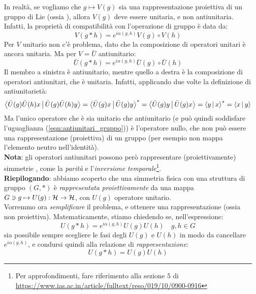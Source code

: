\documentclass[../../FisicaTeorica.tex]{subfiles}
\begin{document}
In realtà, se vogliamo che $g \mapsto V(g)$ sia una rappresentazione proiettiva di un gruppo di Lie (ossia ), allora $V(g)$ deve essere unitaria, e non antiunitaria.\\
Infatti, la proprietà di compatibilità con l'operazione di gruppo è data da:
\[
V(g*h) = e^{i\alpha(g,h)}V(g)\circ V(h)
\]
Per $V$ unitario non c'è problema, dato che la composizione di operatori unitari è ancora unitaria. Ma per $V=\bar{U}$ antiunitario:
\begin{equation}
\bar{U}(g*h) = e^{i\alpha(g,h)}\bar{U}(g)\circ \bar{U}(h)
\label{eqn:antiunitari_gruppo}
\end{equation}
Il membro a sinistra è antiunitario, mentre quello a destra è la composizione di operatori antiunitari, che è unitaria. Infatti, applicando due volte la definizione di antiunitarietà:
\[
\Braket{\bar{U}(g)\bar{U}(h) x|\bar{U}(g)\bar{U}(h)y} = \Braket{\bar{U}(g) x | \bar{U}(g) y}^* = \Braket{\bar{U}(g)y|\bar{U}(g)x} = \Braket{y|x}^* = \Braket{x|y}
\]
Ma l'unico operatore che è sia unitario che antiunitario (e può quindi soddisfare l'uguaglianza (\ref{eqn:antiunitari_gruppo})) è l'operatore nullo, che non può essere una rappresentazione (proiettiva) di un gruppo (per esempio non mappa l'elemento neutro nell'identità).\\

\textbf{Nota}: gli operatori antiunitari possono però rappresentare (proiettivamente) simmetrie , come la \textit{parità} e l'\textit{inversione temporale}\footnote{Per approfondimenti, fare riferimento alla sezione $5$ di \url{https://www.ias.ac.in/article/fulltext/reso/019/10/0900-0916}}.\\

\textbf{Riepilogando}: abbiamo scoperto che una simmetria fisica con una struttura di gruppo $(G,*)$ è \textit{rappresentata proiettivamente} da una mappa $G\ni g\mapsto U(g):\mathcal{H} \to \mathcal{H}$, con $U(g)$ operatore unitario.\\

Vorremmo ora \textit{semplificare} il problema, e ottenere una rappresentazione  (ossia non proiettiva). Matematicamente, stiamo chiedendo se, nell'espressione:
\[
U(g*h)=e^{i\alpha(g,h)}U(g)U(h) \quad g,h \in G
\]
sia possibile sempre scegliere le fasi degli $U(g)$ e $U(h)$ in modo da cancellare $e^{i\alpha(g,h)}$, e condursi quindi alla relazione di \textit{rappresentazione}:
\[
U(g*h) = U(g)U(h)
\]
\end{document}
